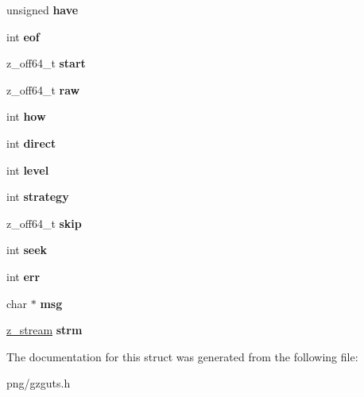 \begin{DoxyCompactItemize}
\item 
unsigned {\bfseries have}\hypertarget{structgz__state_aa658215ab2d34e8bcaac3dedcb6d2616}{}\label{structgz__state_aa658215ab2d34e8bcaac3dedcb6d2616}

\item 
int {\bfseries eof}\hypertarget{structgz__state_ae50ffc823858bc4f909e3d9507356f92}{}\label{structgz__state_ae50ffc823858bc4f909e3d9507356f92}

\item 
z\+\_\+off64\+\_\+t {\bfseries start}\hypertarget{structgz__state_a0eb95c1935a32c508a1e6fc1e84c8f83}{}\label{structgz__state_a0eb95c1935a32c508a1e6fc1e84c8f83}

\item 
z\+\_\+off64\+\_\+t {\bfseries raw}\hypertarget{structgz__state_ae32599fda854ec0d1aee2ce1c72c5afc}{}\label{structgz__state_ae32599fda854ec0d1aee2ce1c72c5afc}

\item 
int {\bfseries how}\hypertarget{structgz__state_ac6e4b7db699aacd089f6d55b01483d6f}{}\label{structgz__state_ac6e4b7db699aacd089f6d55b01483d6f}

\item 
int {\bfseries direct}\hypertarget{structgz__state_a114c6a0de43039853ead48a092792a7d}{}\label{structgz__state_a114c6a0de43039853ead48a092792a7d}

\item 
int {\bfseries level}\hypertarget{structgz__state_aaf5e13a32b8618cde112e4312d480137}{}\label{structgz__state_aaf5e13a32b8618cde112e4312d480137}

\item 
int {\bfseries strategy}\hypertarget{structgz__state_a2777c46311012def486c2aa720fe5203}{}\label{structgz__state_a2777c46311012def486c2aa720fe5203}

\item 
z\+\_\+off64\+\_\+t {\bfseries skip}\hypertarget{structgz__state_a4bc336eac6a48fd0f2645e672e5c6c13}{}\label{structgz__state_a4bc336eac6a48fd0f2645e672e5c6c13}

\item 
int {\bfseries seek}\hypertarget{structgz__state_ab60b82012b8193c3f44b2e48974b9dd9}{}\label{structgz__state_ab60b82012b8193c3f44b2e48974b9dd9}

\item 
int {\bfseries err}\hypertarget{structgz__state_aa9832eb9300c065f6572e5699ab27938}{}\label{structgz__state_aa9832eb9300c065f6572e5699ab27938}

\item 
char $\ast$ {\bfseries msg}\hypertarget{structgz__state_ad49f321739e10ff0387a0e7fe31c6538}{}\label{structgz__state_ad49f321739e10ff0387a0e7fe31c6538}

\item 
\hyperlink{structz__stream__s}{z\+\_\+stream} {\bfseries strm}\hypertarget{structgz__state_a77df647f4deba86cc8a4fa0a01a08f4e}{}\label{structgz__state_a77df647f4deba86cc8a4fa0a01a08f4e}

\end{DoxyCompactItemize}


The documentation for this struct was generated from the following file\+:\begin{DoxyCompactItemize}
\item 
png/gzguts.\+h\end{DoxyCompactItemize}
